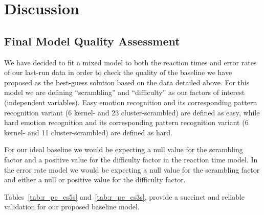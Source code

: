     \section{Discussion}\label{sec:pe_d}
	\subsection{Final Model Quality Assessment}\label{sec:pe_d_fm}
	    We have decided to fit a mixed model to both the reaction times and error rates of our last-run data in order to check the quality of the baseline we have proposed as the best-guess solution based on the data detailed above.
	    For this model we are defining “scrambling” and “difficulty” as our factors of interest (independent variables).
	    Easy emotion recognition and its corresponding pattern recognition variant (\SI{6}{\pixel} kernel- and \SI{23}{\pixel} cluster-scrambled) are defined as easy,
	    while hard emotion recognition and its corresponding pattern recognition variant (\SI{6}{\pixel} kernel- and \SI{11}{\pixel} cluster-scrambled) are defined as hard.
	    
	    For our ideal baseline we would be expecting a null value for the scrambling factor and a positive value for the difficulty factor in the reaction time model.
	    In the error rate model we would be expecting a null value for the scrambling factor and either a null or positive value for the difficulty factor.
	    
	    Tables~\ref{tab:r_pe_cs5s} and~\ref{tab:r_pe_cs3s}, provide a succinct and reliable validation for our proposed baseline model.
	    
